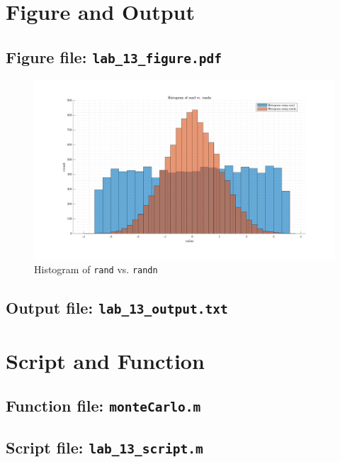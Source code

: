 \section{Figure and Output}
\subsection{Figure file: \lstinline[style=Plain]{lab_13_figure.pdf}}
\begin{figure}[!hbtp]
  \centering
  \includegraphics[width=\textwidth]{../src/lab_13_figure.pdf}
  \caption{Histogram of \lstinline{rand} vs. \lstinline{randn}}
  \label{fig:my_label}
\end{figure}
\subsection{Output file: \lstinline[style=Plain]{lab_13_output.txt}}


\newpage
\section{Script and Function}
\subsection{Function file: \lstinline[style=Plain]{monteCarlo.m}}


\newpage
\subsection{Script file: \lstinline[style=Plain]{lab_13_script.m}}

